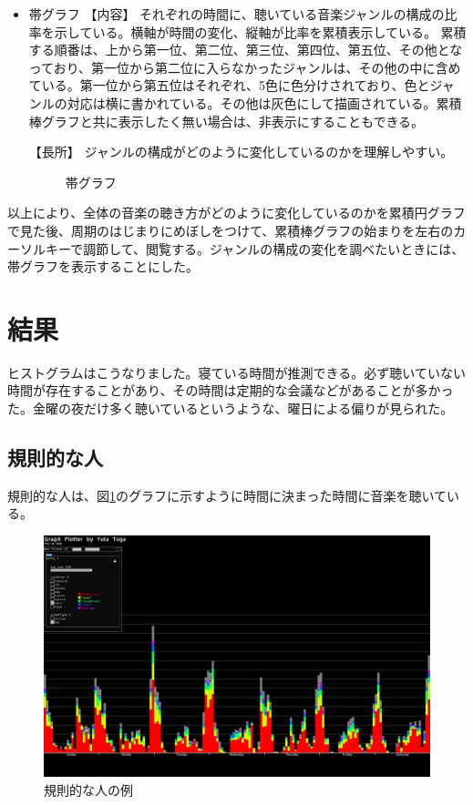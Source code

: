 \documentclass{jsarticle}
\begin{document}
\begin{itemize}
\item
帯グラフ
【内容】
それぞれの時間に、聴いている音楽ジャンルの構成の比率を示している。横軸が時間の変化、縦軸が比率を累積表示している。
累積する順番は、上から第一位、第二位、第三位、第四位、第五位、その他となっており、第一位から第二位に入らなかったジャンルは、その他の中に含めている。第一位から第五位はそれぞれ、5色に色分けされており、色とジャンルの対応は横に書かれている。その他は灰色にして描画されている。累積棒グラフと共に表示したく無い場合は、非表示にすることもできる。

【長所】
ジャンルの構成がどのように変化しているのかを理解しやすい。


\begin{figure}[htbp]
\begin{center}
\caption{帯グラフ}
\end{center}
\end{figure}
\end{itemize}

以上により、全体の音楽の聴き方がどのように変化しているのかを累積円グラフで見た後、周期のはじまりにめぼしをつけて、累積棒グラフの始まりを左右のカーソルキーで調節して、閲覧する。ジャンルの構成の変化を調べたいときには、帯グラフを表示することにした。


\section{結果}

ヒストグラムはこうなりました。寝ている時間が推測できる。必ず聴いていない時間が存在することがあり、その時間は定期的な会議などがあることが多かった。金曜の夜だけ多く聴いているというような、曜日による偏りが見られた。
\subsection{規則的な人}
規則的な人は、図\ref{sample_regular}のグラフに示すように時間に決まった時間に音楽を聴いている。
\begin{figure}[h]
\begin{center}
\includegraphics[width=14cm]{sample_regular.jpg}
\caption{規則的な人の例}
\label{sample_regular}
\end{center}
\end{figure}
\end{document}
